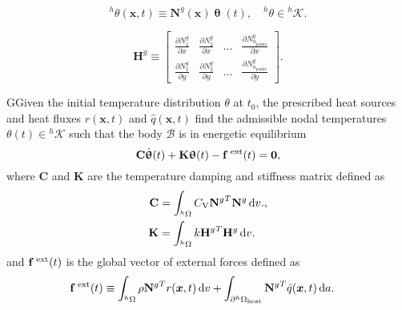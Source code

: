 \begin{highlight}
\begin{equation}
{ }^{h} \theta(\bm{x},t) \equiv \mathbf{N}^{g}(\bm{x}) \bm{\uptheta}(t), \quad{ }^{h} \theta \in{ }^{h} \mathscr{K}.
\end{equation}
\end{highlight}

\begin{equation}
  \mathbf H^g\equiv \left[
  \begin{array}{cccc}
    \displaystyle{\frac{\partial N^g_1}{\partial x}} & \displaystyle{\frac{\partial N^g_2}{\partial x}} & \dots & \displaystyle{\frac{\partial N^g_{n_\text{points}}}{\partial x}} \\[10pt]
    \displaystyle{\frac{\partial N^g_1}{\partial y}} & \displaystyle{\frac{\partial N^g_2}{\partial y}} & \dots & \displaystyle{\frac{\partial N^g_{n_\text{points}}}{\partial y}}
  \end{array}
  \right].
\end{equation}

\begin{problem}
GGiven the initial temperature distribution $\theta$ at $t_0$, the prescribed heat sources and heat fluxes $r(\bm x, t)$ and $\hat q(\bm x, t)$ find the admissible nodal temperatures $\theta(t)\in {^h\mathscr{K}}$ such that the body $\mathscr{B}$ is in energetic equilibrium
\begin{equation}
    \mathbf C \dot{ \bm\uptheta}(t) +\mathbf K\bm\uptheta(t)-\mathbf f^\text{\;ext}(t)=\mathbf 0, \label{eq:equilibrium_material}
\end{equation}
where $\mathbf C$ and \(\mathbf K\) are the temperature damping and stiffness matrix defined as
\begin{align}
  \mathbf C &= \int_{{}^h\Omega} C_\mathrm{V} {\mathbf{N}^g}^T \mathbf{N}^g \,\mathrm{d} v.,\\
  \mathbf K &= \int_{{}^h\Omega} k {\mathbf{H}^g}^T\mathbf{H}^g \,\mathrm{d} v.
\end{align}
and $\mathbf f^\text{\;ext}(t)$ is the global vector of external forces defined as
\begin{align}
    \mathbf f^\text{\;ext}(t) &\equiv \int_{^h\Omega} \rho{\mathbf N^g}^T r(\bm x, t)\,\mathrm{d} v + \int_{\partial^h\Omega_\text{heat}}{\mathbf N^g}^T \hat q(\bm x, t)\,\mathrm{d} a.
\end{align}
\end{problem}
